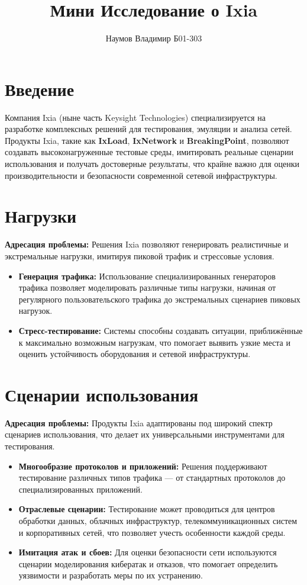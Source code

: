 \documentclass[12pt,a4paper]{article}
\title{Мини Исследование о Ixia}
\author{Наумов Владимир Б01-303}
\date{}
\begin{document}
\maketitle

\section{Введение}
Компания Ixia (ныне часть Keysight Technologies) специализируется на разработке комплексных решений для тестирования, эмуляции и анализа сетей. Продукты Ixia, такие как \textbf{IxLoad}, \textbf{IxNetwork} и \textbf{BreakingPoint}, позволяют создавать высоконагруженные тестовые среды, имитировать реальные сценарии использования и получать достоверные результаты, что крайне важно для оценки производительности и безопасности современной сетевой инфраструктуры.

\section{Нагрузки}
\textbf{Адресация проблемы:} Решения Ixia позволяют генерировать реалистичные и экстремальные нагрузки, имитируя пиковой трафик и стрессовые условия.
\begin{itemize}[leftmargin=2em]
    \item \textbf{Генерация трафика:} Использование специализированных генераторов трафика позволяет моделировать различные типы нагрузки, начиная от регулярного пользовательского трафика до экстремальных сценариев пиковых нагрузок.
    \item \textbf{Стресс-тестирование:} Системы способны создавать ситуации, приближённые к максимально возможным нагрузкам, что помогает выявить узкие места и оценить устойчивость оборудования и сетевой инфраструктуры.
\end{itemize}

\section{Сценарии использования}
\textbf{Адресация проблемы:} Продукты Ixia адаптированы под широкий спектр сценариев использования, что делает их универсальными инструментами для тестирования.
\begin{itemize}[leftmargin=2em]
    \item \textbf{Многообразие протоколов и приложений:} Решения поддерживают тестирование различных типов трафика --- от стандартных протоколов до специализированных приложений.
    \item \textbf{Отраслевые сценарии:} Тестирование может проводиться для центров обработки данных, облачных инфраструктур, телекоммуникационных систем и корпоративных сетей, что позволяет учесть особенности каждой среды.
    \item \textbf{Имитация атак и сбоев:} Для оценки безопасности сети используются сценарии моделирования кибератак и отказов, что помогает определить уязвимости и разработать меры по их устранению.
\end{itemize}
\end{document}
